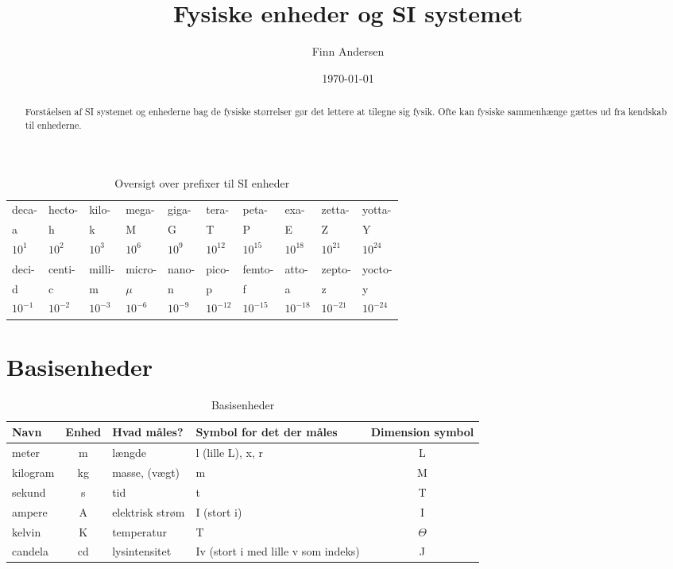 \documentclass{article}
\title{Fysiske enheder og SI systemet}
\author{Finn Andersen}
\date{\today}
\begin{document}
\maketitle

\begin{abstract}
Forståelsen af SI systemet og enhederne bag de fysiske størrelser gør det lettere at tilegne sig fysik. Ofte kan fysiske sammenhænge gættes ud fra kendskab til enhederne.
\end{abstract}

\begin{table}[h]
\caption{Oversigt over prefixer til SI enheder}
\begin{tabular}{llllllllll}
\toprule
deca-&	hecto-&	kilo-	&mega-&	giga-&	tera-	&peta-	&exa-	&zetta-	&yotta-\\
a&	h&	k&	M	&G	&T&	P&	E	&Z&	Y\\
$10^1$&	$10^2$	&$10^3$	&$10^6$	&$10^9$	&$10^{12}$	&$10^{15}$&	$10^{18}$&	$10^{21}$	&$10^{24}$\\\midrule									
deci-	&centi-	&milli-	&micro-&	nano-&	pico-	&femto-&	atto-	&zepto-&	yocto-\\
d&	c&	m&	$\mu$	&n	&p	&f	&a&	z&	y\\
$10^{-1}$&	$10^{-2}$	&$10^{-3}$	&$10^{-6}$	&$10^{-9}$	&$10^{-12}$	&$10^{-15}$&	$10^{-18}$&	$10^{-21}$	&$10^{-24}$\\\midrule
\end{tabular}
\end{table}

\section{Basisenheder}

\begin{table}[h]
\caption{Basisenheder}
\begin{tabular}{lcllc}
\toprule
Navn	&	Enhed	&	Hvad måles?	&	Symbol for det der måles	&	Dimension symbol\\\midrule
meter	&	m	&	længde	&	l (lille L), x, r	&	L\\
kilogram	&	kg	&	masse, (vægt)	&	m	&	M\\
sekund	&	s	&	tid	&	t	&	T\\
ampere	&	A	&	elektrisk strøm	&	I (stort i)	&	I\\
kelvin	&	K	&	temperatur	&	T	&	$\Theta$\\
candela	&	cd	&	lysintensitet	&	Iv (stort i med lille v som indeks)	&	J\\\midrule
\end{tabular}
\end{table}
\end{document}
